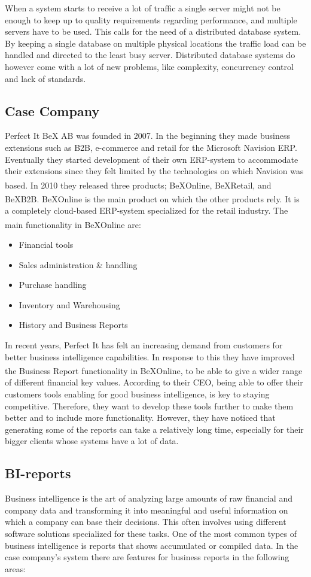 \documentclass{cslthse-msc}
\newcommand{\bex}{BeX\textsuperscript{\textregistered}}
\begin{document}
When a system starts to receive a lot of traffic a single server might not be enough to keep up to quality requirements regarding performance, and multiple servers have to be used. This calls for the need of a distributed database system. By keeping a single database on multiple physical locations the traffic load can be handled and directed to the least busy server. Distributed database systems do however come with a lot of new problems, like complexity, concurrency control and lack of standards.

\subsection{Case Company}
Perfect It BeX AB was founded in 2007. In the beginning they made business extensions such as B2B, e-commerce and retail for the Microsoft Navision ERP. Eventually they started development of their own ERP-system to accommodate their extensions since they felt limited by the technologies on which Navision was based. In 2010 they released three products; \bex Online, \bex Retail, and \bex B2B. \bex Online is the main product on which the other products rely. It is a completely cloud-based ERP-system specialized for the retail industry. The main functionality in \bex Online are:

\begin{itemize}
\item Financial tools
\item Sales administration \& handling
\item Purchase handling
\item Inventory and Warehousing
\item History and Business Reports
\end{itemize}

In recent years, Perfect It has felt an increasing demand from customers for better business intelligence capabilities. In response to this they have improved the Business Report functionality in \bex Online, to be able to give a wider range of different financial key values. According to their CEO, being able to offer their customers tools enabling for good business intelligence, is key to staying competitive. Therefore, they want to develop these tools further to make them better and to include more functionality. However, they have noticed that generating some of the reports can take a relatively long time, especially for their bigger clients whose systems have a lot of data.

\subsection{BI-reports}\label{sec:BI}
Business intelligence is the art of analyzing large amounts of raw financial and company data and transforming it into meaningful and useful information on which a company can base their decisions. This often involves using different software solutions specialized for these tasks. One of the most common types of business intelligence is reports that shows accumulated or compiled data. In the case company's system there are features for business reports in the following areas:
\end{document}
